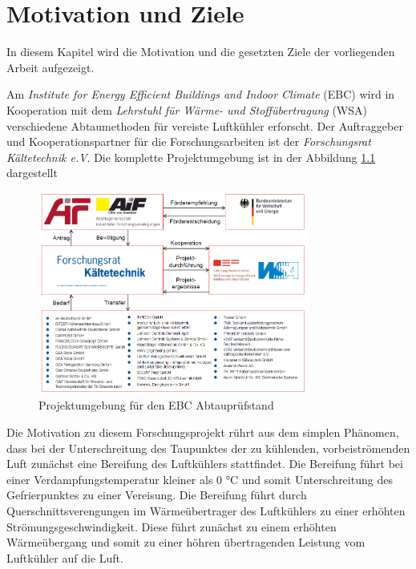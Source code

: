 \chapter{Motivation und Ziele}
\label{cha:Motivation_und_Ziele}

In diesem Kapitel wird die Motivation und die gesetzten Ziele der vorliegenden  Arbeit aufgezeigt.

Am \textit{Institute for Energy Efficient Buildings and Indoor Climate }(EBC) wird in Kooperation mit dem \textit{Lehrstuhl für Wärme- und Stoffübertragung }(WSA) verschiedene Abtaumethoden für vereiste Luftkühler erforscht. Der Auftraggeber und Kooperationspartner für die Forschungsarbeiten ist der \textit{Forschungsrat Kältetechnik e.V}. Die komplette Projektumgebung ist in der Abbildung \ref{fig:Projektumgebung} dargestellt

\begin{figure}[htb]
	\centering
		\includegraphics[width=0.80\textwidth]{Pictures/Projektumgebung.png}
	\caption{Projektumgebung für den EBC Abtauprüfstand \citep{Freitag2015}}
	\label{fig:Projektumgebung}
\end{figure}

Die Motivation zu diesem Forschungsprojekt rührt aus dem simplen Phänomen, dass bei der Unterschreitung des Taupunktes der zu kühlenden, vorbeiströmenden Luft zunächst eine Bereifung des Luftkühlers stattfindet. Die Bereifung führt bei einer Verdampfungstemperatur kleiner als 0 °C und somit Unterschreitung des Gefrierpunktes zu einer Vereisung. Die Bereifung führt durch Querschnittsverengungen im Wärmeübertrager des Luftkühlers zu einer erhöhten Strömungsgeschwindigkeit. Diese führt zunächst zu einem erhöhten Wärmeübergang und somit zu einer höhren übertragenden Leistung vom Luftkühler auf die Luft.\citep{Schydlo2010} 

